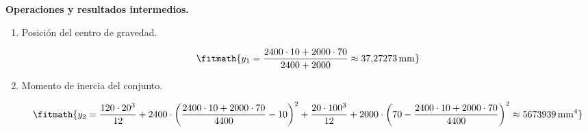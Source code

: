 \noindent\textbf{Operaciones y resultados intermedios.}

\begin{enumerate}

\item Posición del centro de gravedad.

\[\fitmath{y_{1}=\frac{2400\cdot 10+2000\cdot 70}{2400+2000}\approx 37{,}27273\,\mathrm{mm}}\]

\item Momento de inercia del conjunto.

\[\fitmath{y_{2}=\frac{120\cdot {20}^{3}}{12}+2400\cdot {\left(\frac{2400\cdot 10+2000\cdot 70}{4400}-10\right)}^{2}+\frac{20\cdot {100}^{3}}{12}+2000\cdot {\left(70-\frac{2400\cdot 10+2000\cdot 70}{4400}\right)}^{2}\approx 5673939\,\mathrm{mm^{4}}}\]

\end{enumerate}
